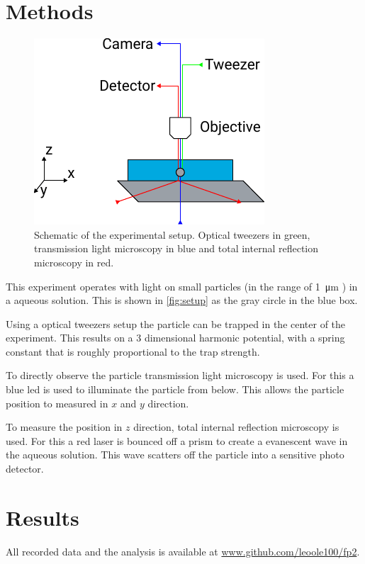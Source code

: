 \documentclass[
    twoside=false,
    twocolumn=true,
    fontsize=11pt,
]{scrarticle}
\begin{document}
\section{Methods}
\begin{figure}
    \centering
    \includegraphics{figures/setup.pdf}
    \caption{Schematic of the experimental setup. Optical tweezers in green, transmission light microscopy in blue and total internal reflection microscopy in red.}
    \label{fig:setup}
\end{figure}
This experiment operates with light on small particles (in the range of \SI{1}{\micro m} \cite{instructions}) in a aqueous solution.
This is shown in \autoref{fig:setup} as the gray circle in the blue box. 

Using a optical tweezers setup the particle can be trapped in the center of the experiment.
This results on a 3 dimensional harmonic potential, with a spring constant that is roughly proportional to the trap strength.

To directly observe the particle transmission light microscopy is used.
For this a blue led is used to illuminate the particle from below.
This allows the particle position to measured in $x$ and $y$ direction.

To measure the position in $z$ direction, total internal reflection microscopy is used.
For this a red laser is bounced off a prism to create a evanescent wave in the aqueous solution.
This wave scatters off the particle into a sensitive photo detector.


\section{Results}
All recorded data and the analysis is available at \url{www.github.com/leoole100/fp2}.
\end{document}
